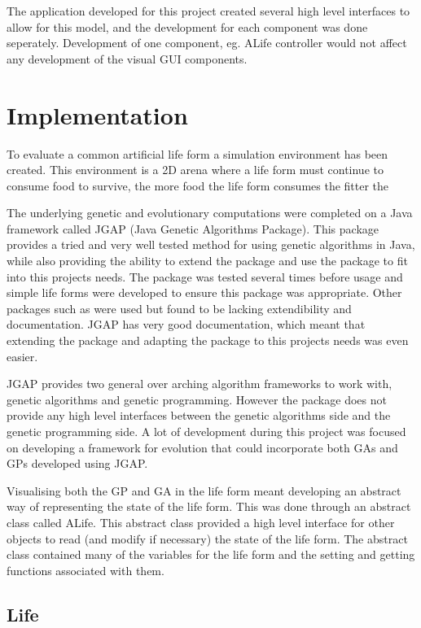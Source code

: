 \documentclass[12pt]{article}
\begin{document}
The application developed for this project created several high level interfaces to allow for this model, and the development for each
component was done seperately. Development of one component, eg. ALife controller would not affect any development of the visual 
GUI components.

\section{Implementation}
To evaluate a common artificial life form a simulation environment has been created.
This environment is a 2D arena where a life form must continue to consume food to survive, the more food the life form consumes the fitter the  

The underlying genetic and evolutionary computations were completed on a Java framework called JGAP (Java Genetic Algorithms Package).
This package provides a tried and very well tested method for using genetic algorithms in Java, while also providing the 
ability to extend the package and use the package to fit into this projects needs. The package was tested several times before usage
and simple life forms were developed to ensure this package was appropriate. Other packages such as %
were used but found to be lacking extendibility and documentation. JGAP has very good documentation, which meant that extending
the package and adapting the package to this projects needs was even easier.

JGAP provides two general over arching algorithm frameworks to work with, genetic algorithms and genetic programming. However
the package does not provide any high level interfaces between the genetic algorithms side and the genetic programming side. A 
lot of development during this project was focused on developing a framework for evolution that could incorporate both GAs and GPs developed
using JGAP. 

Visualising both the GP and GA in the life form meant developing an abstract way of representing the state of the life form. This was done
through an abstract class called ALife. This abstract class provided a high level interface for other objects to read (and modify if necessary)
the state of the life form. The abstract class contained many of the variables for the life form and the setting and getting functions 
associated with them. 

\subsection{Life}
\end{document}
